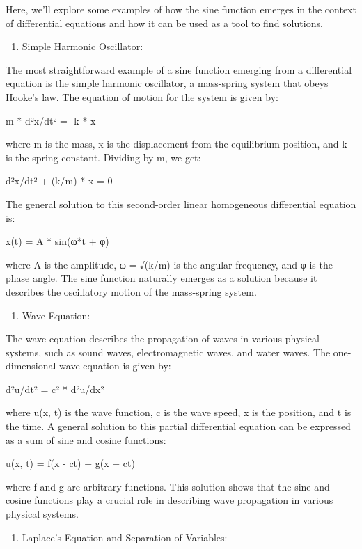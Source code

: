 \documentclass[
]{article}
\providecommand{\tightlist}{%
  \setlength{\itemsep}{0pt}\setlength{\parskip}{0pt}}
\begin{document}
Here, we'll explore some examples of how the sine function emerges in
the context of differential equations and how it can be used as a tool
to find solutions.

\begin{enumerate}
\def\labelenumi{\arabic{enumi}.}
\tightlist
\item
  Simple Harmonic Oscillator:
\end{enumerate}

The most straightforward example of a sine function emerging from a
differential equation is the simple harmonic oscillator, a mass-spring
system that obeys Hooke's law. The equation of motion for the system is
given by:

m * d²x/dt² = -k * x

where m is the mass, x is the displacement from the equilibrium
position, and k is the spring constant. Dividing by m, we get:

d²x/dt² + (k/m) * x = 0

The general solution to this second-order linear homogeneous
differential equation is:

x(t) = A * sin(ω*t + φ)

where A is the amplitude, ω = √(k/m) is the angular frequency, and φ is
the phase angle. The sine function naturally emerges as a solution
because it describes the oscillatory motion of the mass-spring system.

\begin{enumerate}
\def\labelenumi{\arabic{enumi}.}
\setcounter{enumi}{1}
\tightlist
\item
  Wave Equation:
\end{enumerate}

The wave equation describes the propagation of waves in various physical
systems, such as sound waves, electromagnetic waves, and water waves.
The one-dimensional wave equation is given by:

d²u/dt² = c² * d²u/dx²

where u(x, t) is the wave function, c is the wave speed, x is the
position, and t is the time. A general solution to this partial
differential equation can be expressed as a sum of sine and cosine
functions:

u(x, t) = f(x - ct) + g(x + ct)

where f and g are arbitrary functions. This solution shows that the sine
and cosine functions play a crucial role in describing wave propagation
in various physical systems.

\begin{enumerate}
\def\labelenumi{\arabic{enumi}.}
\setcounter{enumi}{2}
\tightlist
\item
  Laplace's Equation and Separation of Variables:
\end{enumerate}
\end{document}
